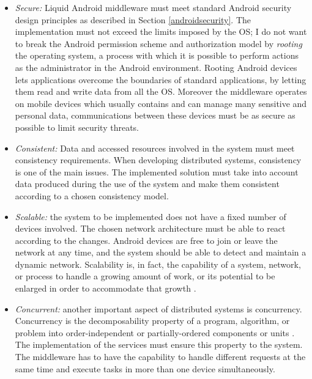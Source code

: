 \begin{itemize}
	\item \textit{Secure:} Liquid Android middleware must meet standard Android security design principles as described in Section \ref{androidsecurity}. The implementation must not exceed the limits imposed by the OS; I do not want to break the Android permission scheme and authorization model by \textit{rooting} the operating system, a process with which it is possible to perform actions as the administrator in the Android environment. Rooting Android devices lets applications overcome the boundaries of standard applications, by letting them read and write data from all the OS. Moreover the middleware operates on mobile devices which usually contains and can manage many sensitive and personal data, communications between these devices must be as secure as possible to limit security threats.
	
	\item \textit{Consistent:} Data and accessed resources involved in the system must meet consistency requirements. When developing distributed systems, consistency is one of the main issues. The implemented solution must take into account data produced during the use of the system and make them consistent according to a chosen consistency model.
	
	\item \textit{Scalable:} the system to be implemented does not have a fixed number of devices involved. The chosen network architecture must be able to react according to the changes. Android devices are free to join or leave the network at any time, and the system should be able to detect and maintain a dynamic network. Scalability is, in fact, the capability of a system, network, or process to handle a growing amount of work, or its potential to be enlarged in order to accommodate that growth \cite{bondi2000characteristics}. 
	
	\item \textit{Concurrent:} another important aspect of distributed systems is concurrency. Concurrency is the decomposability property of a program, algorithm, or problem into order-independent or partially-ordered components or units \cite{lamport1978time}. The implementation of the services must ensure this property to the system. The middleware has to have the capability to handle different requests at the same time and execute tasks in more than one device simultaneously.
	
\end{itemize}
